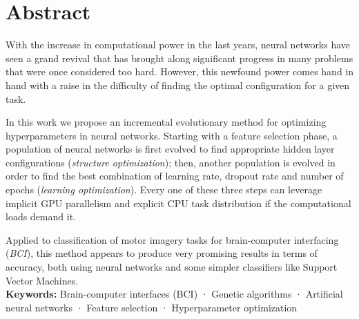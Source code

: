 \begingroup
\let\cleardoublepage\relax
\let\cleardoublepage\relax

\chapter*{Abstract}

With the increase in computational power in the last years, neural networks have seen a grand revival that has brought along significant progress in many problems that were once considered too hard. However, this newfound power comes hand in hand with a raise in the difficulty of finding the optimal configuration for a given task.

In this work we propose an incremental evolutionary method for optimizing hyperparameters in neural networks. Starting with a feature selection phase, a population of neural networks is first evolved to find appropriate hidden layer configurations (\textit{structure optimization}); then, another population is evolved in order to find the best combination of learning rate, dropout rate and number of epochs (\textit{learning optimization}). Every one of these three steps can leverage implicit GPU parallelism and explicit CPU task distribution if the computational loads demand it.

Applied to classification of motor imagery tasks for brain-computer interfacing (\textit{BCI}), this method appears to produce very promising results in terms of accuracy, both using neural networks and some simpler classifiers like Support Vector Machines.\\

\textbf{Keywords:} Brain-computer interfaces (BCI) · Genetic algorithms · Artificial neural networks · Feature selection · Hyperparameter optimization


\vfill
